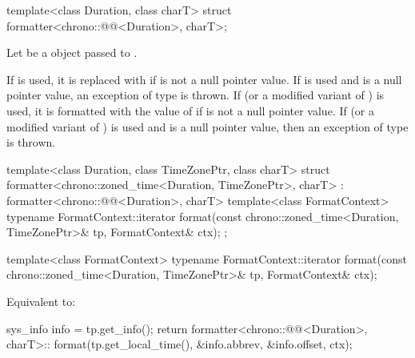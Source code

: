%
\begin{itemdecl}
template<class Duration, class charT>
  struct formatter<chrono::@@<Duration>, charT>;
\end{itemdecl}

\begin{itemdescr}
\pnum
Let  be a  object
passed to .

\pnum
\remarks
If  is used,
it is replaced with 
if  is not a null pointer value.
If  is used
and  is a null pointer value,
an exception of type  is thrown.
If  (or a modified variant of ) is used,
it is formatted with the value of 
if  is not a null pointer value.
If  (or a modified variant of ) is used
and  is a null pointer value,
then an exception of type  is thrown.
\end{itemdescr}

%
\begin{codeblock}
template<class Duration, class TimeZonePtr, class charT>
struct formatter<chrono::zoned_time<Duration, TimeZonePtr>, charT>
    : formatter<chrono::@@<Duration>, charT> {
  template<class FormatContext>
    typename FormatContext::iterator
      format(const chrono::zoned_time<Duration, TimeZonePtr>& tp, FormatContext& ctx);
};
\end{codeblock}

%
\begin{itemdecl}
template<class FormatContext>
  typename FormatContext::iterator
    format(const chrono::zoned_time<Duration, TimeZonePtr>& tp, FormatContext& ctx);
\end{itemdecl}

\begin{itemdescr}
\pnum
\effects
Equivalent to:
\begin{codeblock}
sys_info info = tp.get_info();
return formatter<chrono::@@<Duration>, charT>::
         format({tp.get_local_time(), &info.abbrev, &info.offset}, ctx);
\end{codeblock}
\end{itemdescr}

